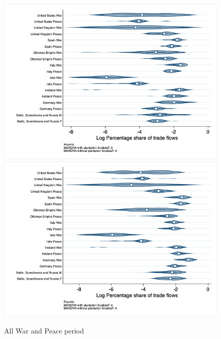 \documentclass[12pt,a4paper,notitlepage,english]{article}
\begin{document}
\begin{appendix}
\begin{figure}[h!]
\caption{All War and Peace period}
\label{peace_war_nat_distr_pays7}
\includegraphics[scale=.4]{peace_war_nat_distr_Ipays7}
\includegraphics[scale=.4]{peace_war_nat_distr_Xpays7}
\end{figure}


\end{appendix}
\end{document}
